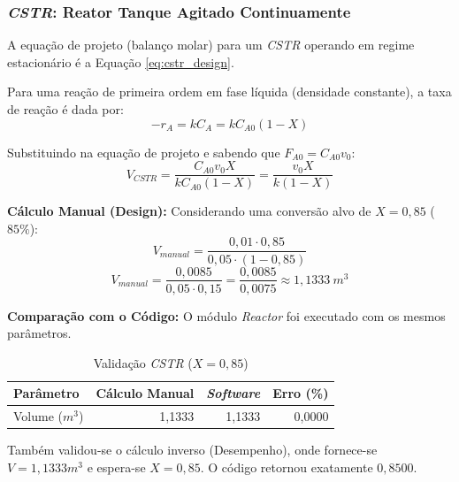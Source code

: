 \subsubsection{\textit{CSTR}: Reator Tanque Agitado Continuamente}

A equação de projeto (balanço molar) para um \textit{CSTR} operando em regime estacionário é a Equação \ref{eq:cstr_design}.

Para uma reação de primeira ordem em fase líquida (densidade constante), a taxa de reação é dada por:
\begin{equation}
    -r_A = k C_A = k C_{A0} (1-X)
    \label{eq:val_rate_law}
\end{equation}

Substituindo na equação de projeto e sabendo que $F_{A0} = C_{A0} v_0$:
\begin{equation}
    V_{CSTR} = \frac{C_{A0} v_0 X}{k C_{A0} (1-X)} = \frac{v_0 X}{k (1-X)}
    \label{eq:val_cstr_vol_deriv}
\end{equation}

\textbf{Cálculo Manual (Design):}
Considerando uma conversão alvo de $X = 0,85$ ($85\%$):
\begin{equation}
    V_{manual} = \frac{0,01 \cdot 0,85}{0,05 \cdot (1 - 0,85)}
    \label{eq:val_cstr_vol_calc_1}
\end{equation}
\begin{equation}
    V_{manual} = \frac{0,0085}{0,05 \cdot 0,15} = \frac{0,0085}{0,0075} \approx 1,1333 \ m^3
    \label{eq:val_cstr_vol_calc_2}
\end{equation}

\textbf{Comparação com o Código:}
O módulo \textit{Reactor} foi executado com os mesmos parâmetros.
\begin{table}[H]
    \centering
    \caption{Validação \textit{CSTR} ($X=0,85$)}
    \begin{tabular}{lrrr}
        \toprule
        \textbf{Parâmetro} & \textbf{Cálculo Manual} & \textbf{\textit{Software}} & \textbf{Erro (\%)} \\
        \midrule
        Volume ($m^3$) & 1,1333 & 1,1333 & 0,0000 \\
        \bottomrule
    \end{tabular}
\end{table}

Também validou-se o cálculo inverso (Desempenho), onde fornece-se $V=1,1333 m^3$ e espera-se $X=0,85$. O código retornou exatamente $0,8500$.


